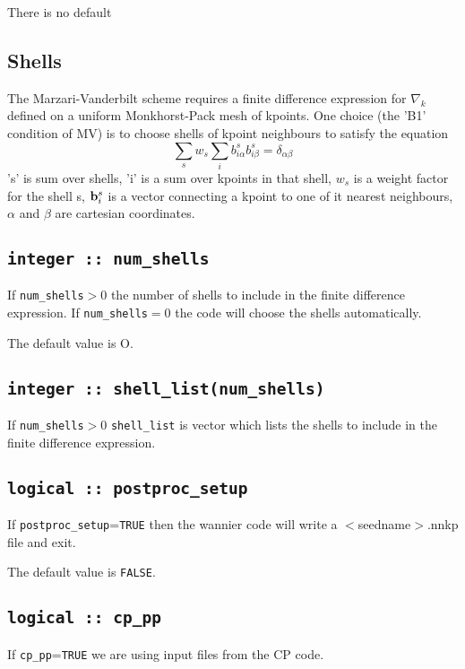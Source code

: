 
There is no default

\subsection{Shells}

The Marzari-Vanderbilt scheme requires a finite difference expression for $\nabla_k$
defined on a uniform Monkhorst-Pack mesh of kpoints. One choice (the 'B1' condition of MV)
is to choose shells of kpoint neighbours to satisfy the equation
\begin{equation}\nonumber
\sum_s w_s \sum_i b_{i\alpha}^s b_{i\beta}^s = \delta_{\alpha\beta}
\end{equation}
's' is sum over shells, 'i' is a sum over kpoints in that shell, $w_s$ is a weight factor for the shell s, ${\bf b}_{i}^s$
is a vector connecting a kpoint to one of it nearest neighbours, $\alpha$ and $\beta$ are cartesian coordinates.

\subsection[num\_shells]{\tt integer :: num\_shells}

If \verb#num_shells#$>0$ the number of shells to include in the finite difference expression.
If \verb#num_shells#$=0$ the code will choose the shells automatically. 

The default value is O.

\subsection[shell\_list]{\tt integer :: shell\_list(num\_shells)}

If \verb#num_shells#$>0$ \verb#shell_list# is vector which lists the shells to include in the
finite difference expression.



\subsection[postproc\_setup]{\tt logical :: postproc\_setup}
If \verb#postproc_setup#=\verb#TRUE# then the wannier code will write 
a $<$seedname$>$.nnkp file and exit.

The default value is \verb#FALSE#.


\subsection[cp\_pp]{\tt logical :: cp\_pp}
If \verb#cp_pp#=\verb#TRUE# we are using input files from the CP code.
                                                                                                                              
